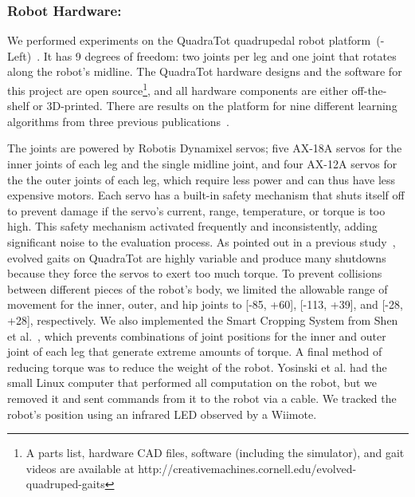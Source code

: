 \subsubsection{Robot Hardware:}

We performed experiments on the QuadraTot quadrupedal robot platform~(-Left)~\cite{yos:clune}.
It has 9 degrees of freedom: two joints per leg and one joint that rotates along the robot's midline. %
The QuadraTot hardware designs and the software for this project are open source\footnote{A parts list, hardware CAD files, software (including the simulator), and gait videos are available at http://creativemachines.cornell.edu/evolved-quadruped-gaits}, and all hardware components are either off-the-shelf or 3D-printed. %
There are results on the platform for nine different learning algorithms from three previous publications~\cite{yos:clune,glette,haocheng}. 


The joints are powered by Robotis Dynamixel servos; five AX-18A servos for the inner joints of each leg and the single midline joint, and four AX-12A servos for the the outer joints of each leg, which require less power and can thus have less expensive motors. 
Each servo has a built-in safety mechanism that shuts itself off to prevent damage if the servo's current, range, temperature, or torque is too high. This safety mechanism activated frequently and inconsistently, adding significant noise to the evaluation process. As pointed out in a previous study~\cite{yos:clune}, evolved gaits on QuadraTot are highly variable and produce many shutdowns because they force the servos to exert too much torque.
To prevent collisions between different pieces of the robot's body, we limited the allowable range of movement for the inner, outer, and hip joints to [-85\degree, +60\degree], [-113\degree, +39\degree], and [-28\degree, +28\degree], respectively. We also implemented the Smart Cropping System from Shen et al.~\cite{haocheng}, which prevents combinations of joint positions for the inner and outer joint of each leg that generate extreme amounts of torque. A final method of reducing torque was to reduce the weight of the robot. Yosinski et al. had the small Linux computer that performed all computation on the robot, but we removed it and sent commands from it to the robot via a cable. We tracked the robot's position using an infrared LED observed by a Wiimote.
